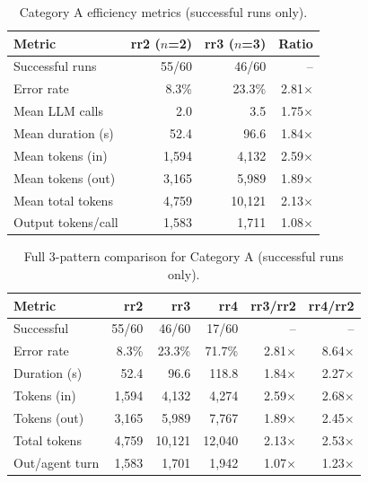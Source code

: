 \documentclass{article}
\begin{document}
\begin{table}[H]
\centering
\caption{Category A efficiency metrics (successful runs only).}
\label{tab:catA}
{\small
\begin{tabular}{@{}lrrr@{}}
\toprule
\textbf{Metric} & \textbf{rr2} ($n$=2) & \textbf{rr3} ($n$=3) & \textbf{Ratio} \\
\midrule
Successful runs & 55/60 & 46/60 & -- \\
Error rate & 8.3\% & 23.3\% & 2.81$\times$ \\
Mean LLM calls & 2.0 & 3.5 & 1.75$\times$ \\
Mean duration (s) & 52.4 & 96.6 & 1.84$\times$ \\
Mean tokens (in) & 1,594 & 4,132 & 2.59$\times$ \\
Mean tokens (out) & 3,165 & 5,989 & 1.89$\times$ \\
Mean total tokens & 4,759 & 10,121 & 2.13$\times$ \\
Output tokens/call & 1,583 & 1,711 & 1.08$\times$ \\
\bottomrule
\end{tabular}
}
\end{table}

\begin{table}[H]
\centering
\caption{Full 3-pattern comparison for Category A (successful runs only).}
\label{tab:catA_full}
{\small
\begin{tabular}{@{}lrrrrr@{}}
\toprule
\textbf{Metric} & \textbf{rr2} & \textbf{rr3} & \textbf{rr4} & \textbf{rr3/rr2} & \textbf{rr4/rr2} \\
\midrule
Successful & 55/60 & 46/60 & 17/60 & -- & -- \\
Error rate & 8.3\% & 23.3\% & 71.7\% & 2.81$\times$ & 8.64$\times$ \\
Duration (s) & 52.4 & 96.6 & 118.8 & 1.84$\times$ & 2.27$\times$ \\
Tokens (in) & 1,594 & 4,132 & 4,274 & 2.59$\times$ & 2.68$\times$ \\
Tokens (out) & 3,165 & 5,989 & 7,767 & 1.89$\times$ & 2.45$\times$ \\
Total tokens & 4,759 & 10,121 & 12,040 & 2.13$\times$ & 2.53$\times$ \\
Out/agent turn & 1,583 & 1,701 & 1,942 & 1.07$\times$ & 1.23$\times$ \\
\bottomrule
\end{tabular}
}
\end{table}
\end{document}
